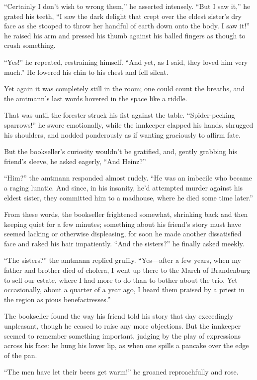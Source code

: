 \documentclass[12pt,a4paper]{article}
\begin{document}
“Certainly I don’t wish to wrong them,” he asserted intensely. “But I saw it,” he grated his teeth, “I saw the dark delight that crept over the eldest sister’s dry face as she stooped to throw her handful of earth down onto the body. I saw it!” he raised his arm and pressed his thumb against his balled fingers as though to crush something.

“Yes!” he repeated, restraining himself. “And yet, as I said, they loved him very much.” He lowered his chin to his chest and fell silent.

Yet again it was completely still in the room; one could count the breaths, and the amtmann’s last words hovered in the space like a riddle.

That was until the forester struck his fist against the table. “Spider-pecking sparrows!” he swore emotionally, while the innkeeper clapped his hands, shrugged his shoulders, and nodded ponderously as if wanting graciously to affirm fate.

But the bookseller’s curiosity wouldn’t be gratified, and, gently grabbing his friend’s sleeve, he asked eagerly, “And Heinz?”

“Him?” the amtmann responded almost rudely. “He was an imbecile who became a raging lunatic. And since, in his insanity, he’d attempted murder against his eldest sister, they committed him to a madhouse, where he died some time later.”

From these words, the bookseller frightened somewhat, shrinking back and then keeping quiet for a few minutes; something about his friend’s story must have seemed lacking or otherwise displeasing, for soon he made another dissatisfied face and raked his hair impatiently. “And the sisters?” he finally asked meekly.

“The sisters?” the amtmann replied gruffly. “Yes—after a few years, when my father and brother died of cholera, I went up there to the March of Brandenburg to sell our estate, where I had more to do than to bother about the trio. Yet occasionally, about a quarter of a year ago, I heard them praised by a priest in the region as pious benefactresses.”

The bookseller found the way his friend told his story that day exceedingly unpleasant, though he ceased to raise any more objections. But the innkeeper seemed to remember something important, judging by the play of expressions across his face: he hung his lower lip, as when one spills a pancake over the edge of the pan.

“The men have let their beers get warm!” he groaned reproachfully and rose.
\end{document}
